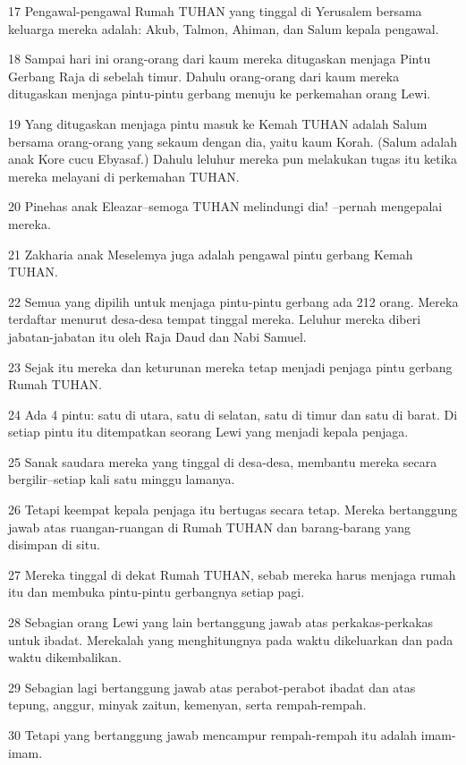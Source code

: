 \par 17 Pengawal-pengawal Rumah TUHAN yang tinggal di Yerusalem bersama keluarga mereka adalah: Akub, Talmon, Ahiman, dan Salum kepala pengawal.
\par 18 Sampai hari ini orang-orang dari kaum mereka ditugaskan menjaga Pintu Gerbang Raja di sebelah timur. Dahulu orang-orang dari kaum mereka ditugaskan menjaga pintu-pintu gerbang menuju ke perkemahan orang Lewi.
\par 19 Yang ditugaskan menjaga pintu masuk ke Kemah TUHAN adalah Salum bersama orang-orang yang sekaum dengan dia, yaitu kaum Korah. (Salum adalah anak Kore cucu Ebyasaf.) Dahulu leluhur mereka pun melakukan tugas itu ketika mereka melayani di perkemahan TUHAN.
\par 20 Pinehas anak Eleazar--semoga TUHAN melindungi dia! --pernah mengepalai mereka.
\par 21 Zakharia anak Meselemya juga adalah pengawal pintu gerbang Kemah TUHAN.
\par 22 Semua yang dipilih untuk menjaga pintu-pintu gerbang ada 212 orang. Mereka terdaftar menurut desa-desa tempat tinggal mereka. Leluhur mereka diberi jabatan-jabatan itu oleh Raja Daud dan Nabi Samuel.
\par 23 Sejak itu mereka dan keturunan mereka tetap menjadi penjaga pintu gerbang Rumah TUHAN.
\par 24 Ada 4 pintu: satu di utara, satu di selatan, satu di timur dan satu di barat. Di setiap pintu itu ditempatkan seorang Lewi yang menjadi kepala penjaga.
\par 25 Sanak saudara mereka yang tinggal di desa-desa, membantu mereka secara bergilir--setiap kali satu minggu lamanya.
\par 26 Tetapi keempat kepala penjaga itu bertugas secara tetap. Mereka bertanggung jawab atas ruangan-ruangan di Rumah TUHAN dan barang-barang yang disimpan di situ.
\par 27 Mereka tinggal di dekat Rumah TUHAN, sebab mereka harus menjaga rumah itu dan membuka pintu-pintu gerbangnya setiap pagi.
\par 28 Sebagian orang Lewi yang lain bertanggung jawab atas perkakas-perkakas untuk ibadat. Merekalah yang menghitungnya pada waktu dikeluarkan dan pada waktu dikembalikan.
\par 29 Sebagian lagi bertanggung jawab atas perabot-perabot ibadat dan atas tepung, anggur, minyak zaitun, kemenyan, serta rempah-rempah.
\par 30 Tetapi yang bertanggung jawab mencampur rempah-rempah itu adalah imam-imam.
